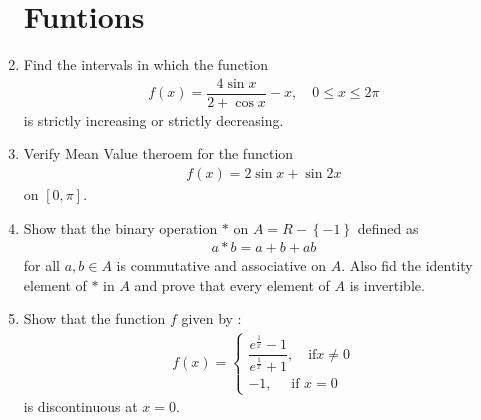 \documentclass[12pt,-letter paper]{article}
\theoremstyle{remark}
\providecommand{\sbrak}[1]{\ensuremath{{}\left[#1\right]}}
\providecommand{\brak}[1]{\ensuremath{\left(#1\right)}}
\providecommand{\cbrak}[1]{\ensuremath{\left\{#1\right\}}}
\begin{document}
\begin{enumerate}
            \section{Funtions}
      \item Find the intervals in which the function
            \begin{align*}
                  f\brak{x}= \dfrac{4\sin x}{2+\cos x} -x,\quad 0 \leq x \leq 2\pi
            \end{align*}
            is strictly increasing or strictly decreasing.
      \item Verify Mean Value theroem for the function
            \begin{align*}
                  f\brak{x}= 2\sin x + \sin 2x
            \end{align*}
            on $\sbrak{0,\pi}$.
      \item Show that the binary operation $*$ on $ A=R -\cbrak{-1}$ defined as
            \begin{align*}
                  a*b= a+b+ab
            \end{align*}
            for all $a,b \in A$ is commutative and associative on $A$. Also fid the identity element of $*$ in $A$ and prove that every element of $A$ is invertible.\item Show that the function $f$ given by :
            \begin{align*}
                  f\brak{x} = \begin{cases}
                                    \dfrac{e^{\frac{1}{x}}-1}{e^{\frac{1}{x}}+1} ,\quad \text{if} x\neq 0 \\
                                    -1,\quad \text{ if } x=0
                              \end{cases}
            \end{align*}
            is discontinuous at $x=0$.

\end{enumerate}
\end{document}
